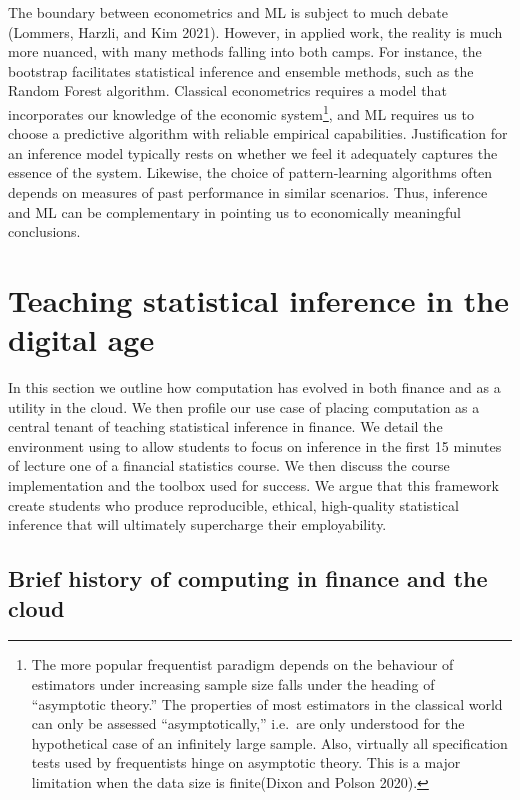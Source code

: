 \documentclass{article}
\begin{document}
The boundary between econometrics and ML is subject to much debate
(Lommers, Harzli, and Kim 2021). However, in applied work, the reality
is much more nuanced, with many methods falling into both camps. For
instance, the bootstrap facilitates statistical inference and ensemble
methods, such as the Random Forest algorithm. Classical econometrics
requires a model that incorporates our knowledge of the economic
system\footnote{The more popular frequentist paradigm depends on the
  behaviour of estimators under increasing sample size falls under the
  heading of ``asymptotic theory.'' The properties of most estimators in
  the classical world can only be assessed ``asymptotically,'' i.e.~are
  only understood for the hypothetical case of an infinitely large
  sample. Also, virtually all specification tests used by frequentists
  hinge on asymptotic theory. This is a major limitation when the data
  size is finite(Dixon and Polson 2020).}, and ML requires us to choose
a predictive algorithm with reliable empirical capabilities.
Justification for an inference model typically rests on whether we feel
it adequately captures the essence of the system. Likewise, the choice
of pattern-learning algorithms often depends on measures of past
performance in similar scenarios. Thus, inference and ML can be
complementary in pointing us to economically meaningful conclusions.

\hypertarget{teaching-statistical-inference-in-the-digital-age}{%
\section{Teaching statistical inference in the digital
age}\label{teaching-statistical-inference-in-the-digital-age}}

In this section we outline how computation has evolved in both finance
and as a utility in the cloud. We then profile our use case of placing
computation as a central tenant of teaching statistical inference in
finance. We detail the environment using to allow students to focus on
inference in the first 15 minutes of lecture one of a financial
statistics course. We then discuss the course implementation and the
toolbox used for success. We argue that this framework create students
who produce reproducible, ethical, high-quality statistical inference
that will ultimately supercharge their employability.

\hypertarget{brief-history-of-computing-in-finance-and-the-cloud}{%
\subsection{Brief history of computing in finance and the
cloud}\label{brief-history-of-computing-in-finance-and-the-cloud}}
\end{document}
